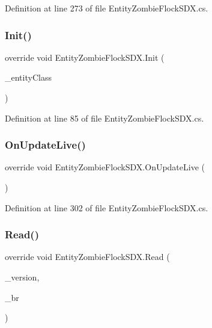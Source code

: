 Definition at line 273 of file Entity\+Zombie\+Flock\+S\+D\+X.\+cs.

\mbox{\label{class_entity_zombie_flock_s_d_x_ab2c8f83118451e6c8d6b7b5d06f72a41}} 
\subsubsection{\texorpdfstring{Init()}{Init()}}
{\footnotesize\ttfamily override void Entity\+Zombie\+Flock\+S\+D\+X.\+Init (\begin{DoxyParamCaption}\item[{int}]{\+\_\+entity\+Class }\end{DoxyParamCaption})}



Definition at line 85 of file Entity\+Zombie\+Flock\+S\+D\+X.\+cs.

\mbox{\label{class_entity_zombie_flock_s_d_x_a30325689af703b6ae155a9973834ebfb}} 
\subsubsection{\texorpdfstring{OnUpdateLive()}{OnUpdateLive()}}
{\footnotesize\ttfamily override void Entity\+Zombie\+Flock\+S\+D\+X.\+On\+Update\+Live (\begin{DoxyParamCaption}{ }\end{DoxyParamCaption})}



Definition at line 302 of file Entity\+Zombie\+Flock\+S\+D\+X.\+cs.

\mbox{\label{class_entity_zombie_flock_s_d_x_acc714fdc92fd4f9d5d72d91547657e13}} 
\subsubsection{\texorpdfstring{Read()}{Read()}}
{\footnotesize\ttfamily override void Entity\+Zombie\+Flock\+S\+D\+X.\+Read (\begin{DoxyParamCaption}\item[{byte}]{\+\_\+version,  }\item[{Binary\+Reader}]{\+\_\+br }\end{DoxyParamCaption})}



